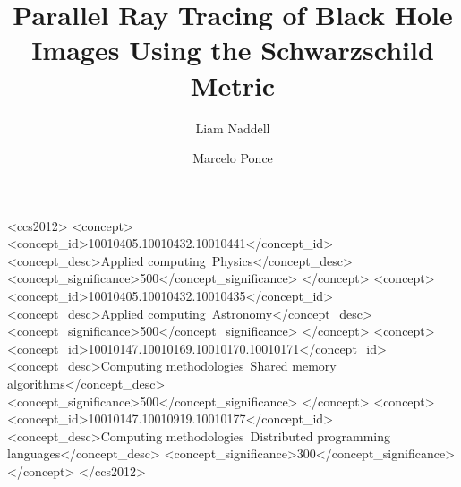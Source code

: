 \documentclass[sigconf]{acmart}
\begin{document}
\title{Parallel Ray Tracing of Black Hole Images Using the Schwarzschild Metric}

\author{Liam Naddell}
\author{Marcelo Ponce}



\begin{abstract}

\end{abstract}

\begin{CCSXML}
<ccs2012>
   <concept>
       <concept_id>10010405.10010432.10010441</concept_id>
       <concept_desc>Applied computing~Physics</concept_desc>
       <concept_significance>500</concept_significance>
       </concept>
   <concept>
       <concept_id>10010405.10010432.10010435</concept_id>
       <concept_desc>Applied computing~Astronomy</concept_desc>
       <concept_significance>500</concept_significance>
       </concept>
   <concept>
       <concept_id>10010147.10010169.10010170.10010171</concept_id>
       <concept_desc>Computing methodologies~Shared memory algorithms</concept_desc>
       <concept_significance>500</concept_significance>
       </concept>
   <concept>
       <concept_id>10010147.10010919.10010177</concept_id>
       <concept_desc>Computing methodologies~Distributed programming languages</concept_desc>
       <concept_significance>300</concept_significance>
       </concept>
 </ccs2012>
\end{CCSXML}
\end{document}
